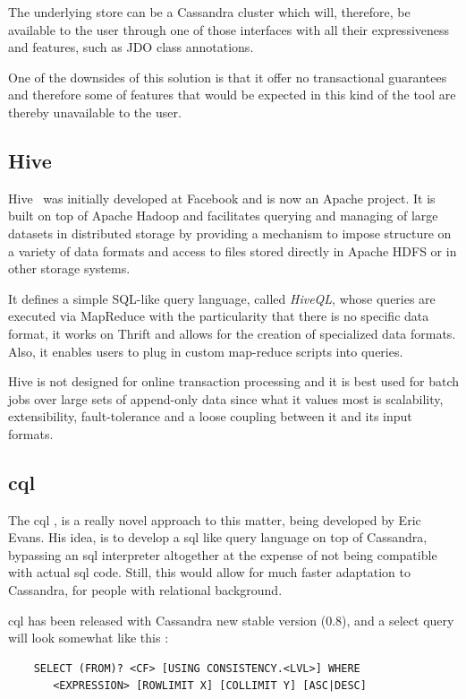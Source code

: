 The underlying store can be a Cassandra cluster which will, therefore, be available to the user through one of those interfaces with all their expressiveness and features, such as JDO class annotations.

One of the downsides of this solution is that it offer no transactional guarantees and therefore some of features that would be expected in this kind of the tool are thereby unavailable to the user. 

\subsection{Hive}
Hive~\cite{Thusoo:2009:HWS:1687553.1687609} was initially developed at Facebook and is now an Apache project. It is built on top of Apache Hadoop and facilitates querying and managing of large datasets in distributed storage by providing a mechanism to impose structure on a variety of data formats and access to files stored directly in Apache HDFS or in other storage systems. 

It defines a simple SQL-like query language, called \emph{HiveQL}, whose queries are executed via MapReduce with the particularity that there is no specific data format, it works on Thrift and allows for the creation of specialized data formats. Also, it enables users to plug in custom map-reduce scripts into queries.

Hive is not designed for online transaction processing and it is best used for batch jobs over large sets of append-only data since what it values most is scalability, extensibility, fault-tolerance and a loose coupling between it and its input formats. 

\subsection{\acl{cql}}

The \ac{cql} \cite{cql}, is a really novel approach to this matter, being developed by Eric Evans. His idea, is to develop a \ac{sql} like query language on top of Cassandra, bypassing an \ac{sql} interpreter altogether at the expense of not being compatible with actual \ac{sql}  code. Still, this would allow for much faster adaptation to Cassandra, for people with relational background. 

\ac{cql} has been released with Cassandra new stable version (0.8), and a select query will look somewhat like this \cite{cqlSelect}:

\begin{center}
\begin{verbatim}
    SELECT (FROM)? <CF> [USING CONSISTENCY.<LVL>] WHERE 
       <EXPRESSION> [ROWLIMIT X] [COLLIMIT Y] [ASC|DESC]
\end{verbatim}
\end{center}


